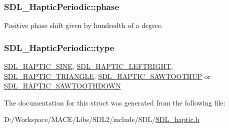 \subsubsection[{\texorpdfstring{phase}{phase}}]{ S\+D\+L\+\_\+\+Haptic\+Periodic\+::phase}\hypertarget{struct_s_d_l___haptic_periodic_a25e8c6aebc78bd74b9343fa228d25d8f}{}\label{struct_s_d_l___haptic_periodic_a25e8c6aebc78bd74b9343fa228d25d8f}
Positive phase shift given by hundredth of a degree. 
\subsubsection[{\texorpdfstring{type}{type}}]{ S\+D\+L\+\_\+\+Haptic\+Periodic\+::type}\hypertarget{struct_s_d_l___haptic_periodic_ac53c5725e8cff012e9b90e01b7110869}{}\label{struct_s_d_l___haptic_periodic_ac53c5725e8cff012e9b90e01b7110869}
\hyperlink{_s_d_l__haptic_8h_aa6d75adbfcdda5075078e7a2849da5c0}{S\+D\+L\+\_\+\+H\+A\+P\+T\+I\+C\+\_\+\+S\+I\+NE}, \hyperlink{_s_d_l__haptic_8h_ae047624d8458ff6400887c37a36f86d3}{S\+D\+L\+\_\+\+H\+A\+P\+T\+I\+C\+\_\+\+L\+E\+F\+T\+R\+I\+G\+HT}, \hyperlink{_s_d_l__haptic_8h_ae8123eaa51511507375ba6ef9220fa46}{S\+D\+L\+\_\+\+H\+A\+P\+T\+I\+C\+\_\+\+T\+R\+I\+A\+N\+G\+LE}, \hyperlink{_s_d_l__haptic_8h_ab8e3f40f3c2bcee8905d13b634363c3f}{S\+D\+L\+\_\+\+H\+A\+P\+T\+I\+C\+\_\+\+S\+A\+W\+T\+O\+O\+T\+H\+UP} or \hyperlink{_s_d_l__haptic_8h_afd64aa747034a7ccf4b55f6246525701}{S\+D\+L\+\_\+\+H\+A\+P\+T\+I\+C\+\_\+\+S\+A\+W\+T\+O\+O\+T\+H\+D\+O\+WN} 

The documentation for this struct was generated from the following file\+:\begin{DoxyCompactItemize}
\item 
D\+:/\+Workspace/\+M\+A\+C\+E/\+Libs/\+S\+D\+L2/include/\+S\+D\+L/\hyperlink{_s_d_l__haptic_8h}{S\+D\+L\+\_\+haptic.\+h}\end{DoxyCompactItemize}
